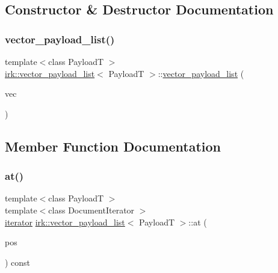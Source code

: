 \subsection{Constructor \& Destructor Documentation}
\mbox{\label{classirk_1_1vector__payload__list_a3d56b520de4d0859f27c3be48fb8067c}} 
\subsubsection{\texorpdfstring{vector\+\_\+payload\+\_\+list()}{vector\_payload\_list()}}
{\footnotesize\ttfamily template$<$class PayloadT $>$ \\
\mbox{\hyperlink{classirk_1_1vector__payload__list}{irk\+::vector\+\_\+payload\+\_\+list}}$<$ PayloadT $>$\+::\mbox{\hyperlink{classirk_1_1vector__payload__list}{vector\+\_\+payload\+\_\+list}} (\begin{DoxyParamCaption}\item[{std\+::vector$<$ \mbox{\hyperlink{classirk_1_1vector__payload__list_acded07bf18f4c147495e0b0dfdbf8922}{value\+\_\+type}} $>$}]{vec }\end{DoxyParamCaption})\hspace{0.3cm}{\ttfamily [inline]}}



\subsection{Member Function Documentation}
\mbox{\label{classirk_1_1vector__payload__list_a2490b25027ce0e8c2689557d06e910e8}} 
\subsubsection{\texorpdfstring{at()}{at()}}
{\footnotesize\ttfamily template$<$class PayloadT $>$ \\
template$<$class Document\+Iterator $>$ \\
\mbox{\hyperlink{classirk_1_1vector__payload__list_a33f425e324f556bba403c1700ff9915e}{iterator}} \mbox{\hyperlink{classirk_1_1vector__payload__list}{irk\+::vector\+\_\+payload\+\_\+list}}$<$ PayloadT $>$\+::at (\begin{DoxyParamCaption}\item[{Document\+Iterator}]{pos }\end{DoxyParamCaption}) const\hspace{0.3cm}{\ttfamily [inline]}}

